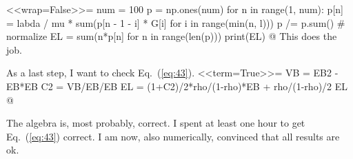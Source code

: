 \begin{question}
\begin{solution}
<<wrap=False>>=
num = 100
p = np.ones(num)
for n in range(1, num):
    p[n] = labda / mu * sum(p[n - 1 - i] * G[i] for i in range(min(n, l)))
p /= p.sum()  # normalize
EL = sum(n*p[n] for n in range(len(p)))
print(EL)
@
This does the job.

As a last step, I want to check Eq.~(\ref{eq:43}).
<<term=True>>=
VB = EB2 - EB*EB
C2 = VB/EB/EB
EL = (1+C2)/2*rho/(1-rho)*EB + rho/(1-rho)/2
EL
@

The algebra is, most probably, correct. I spent at least one hour to
get Eq.~(\ref{eq:43}) correct. I am now, also numerically, convinced
that all results are ok.


\end{solution}
\end{question}




